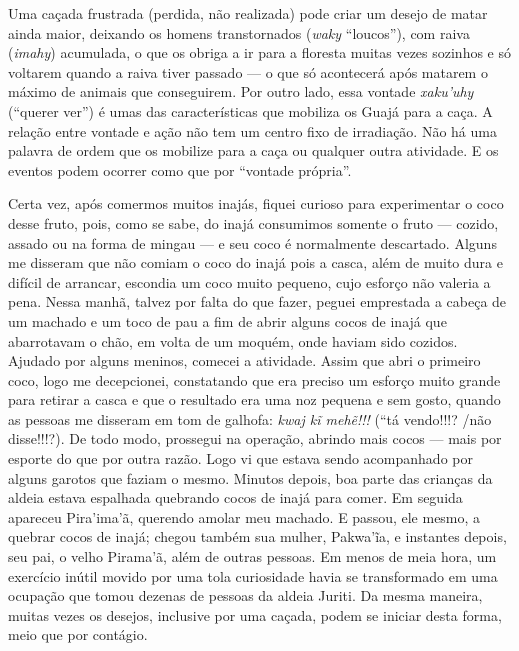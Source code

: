 Uma caçada frustrada (perdida, não realizada) pode criar um desejo de
matar ainda maior, deixando os homens transtornados (\emph{waky}
``loucos''), com raiva (\emph{imahy}) acumulada, o que os obriga a ir para
a floresta muitas vezes sozinhos e só voltarem quando a raiva tiver
passado --- o que só acontecerá após matarem o máximo de animais que
conseguirem. Por outro lado, essa vontade \emph{xaku'uhy} (``querer ver'')
é umas das características que mobiliza os Guajá para a caça. A relação
entre vontade e ação não tem um centro fixo de irradiação. Não há uma
palavra de ordem que os mobilize para a caça ou qualquer outra
atividade. E os eventos podem ocorrer como que por ``vontade própria''.

Certa vez, após comermos muitos inajás, fiquei curioso para experimentar
o coco desse fruto, pois, como se sabe, do inajá consumimos somente o
fruto --- cozido, assado ou na forma de mingau --- e seu coco é normalmente
descartado. Alguns me disseram que não comiam o coco do inajá pois a
casca, além de muito dura e difícil de arrancar, escondia um coco muito
pequeno, cujo esforço não valeria a pena. Nessa manhã, talvez por falta
do que fazer, peguei emprestada a cabeça de um machado e um toco de pau
a fim de abrir alguns cocos de inajá que abarrotavam o chão, em volta de
um moquém, onde haviam sido cozidos. Ajudado por alguns meninos, comecei
a atividade. Assim que abri o primeiro coco, logo me decepcionei,
constatando que era preciso um esforço muito grande para retirar a casca
e que o resultado era uma noz pequena e sem gosto, quando as pessoas me
disseram em tom de galhofa: \emph{kwaj kĩ mehẽ!!!} (``tá vendo!!!? /não
disse!!!?). De todo modo, prossegui na operação, abrindo mais cocos ---
mais por esporte do que por outra razão. Logo vi que estava sendo
acompanhado por alguns garotos que faziam o mesmo. Minutos depois, boa
parte das crianças da aldeia estava espalhada quebrando cocos de inajá
para comer. Em seguida apareceu Pira'ima'ã, querendo amolar meu machado.
E passou, ele mesmo, a quebrar cocos de inajá; chegou também sua mulher,
Pakwa'ĩa, e instantes depois, seu pai, o velho Pirama'ã, além de outras
pessoas. Em menos de meia hora, um exercício inútil movido por uma tola
curiosidade havia se transformado em uma ocupação que tomou dezenas de
pessoas da aldeia Juriti. Da mesma maneira, muitas vezes os desejos,
inclusive por uma caçada, podem se iniciar desta forma, meio que por
contágio.

